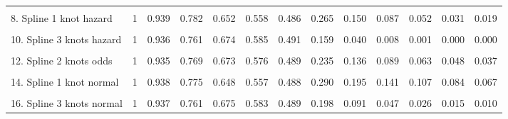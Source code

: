 \documentclass[]{article}
\begin{document}
{\begin{tabular}{lrrrrrrrrrrrr}
\cellcolor{gray!6}{7. Generalised Gamma} & \cellcolor{gray!6}{1} & \cellcolor{gray!6}{0.937} & \cellcolor{gray!6}{0.774} & \cellcolor{gray!6}{0.648} & \cellcolor{gray!6}{0.556} & \cellcolor{gray!6}{0.488} & \cellcolor{gray!6}{0.310} & \cellcolor{gray!6}{0.232} & \cellcolor{gray!6}{0.187} & \cellcolor{gray!6}{0.158} & \cellcolor{gray!6}{0.138} & \cellcolor{gray!6}{0.122}\\
8. Spline 1 knot hazard & 1 & 0.939 & 0.782 & 0.652 & 0.558 & 0.486 & 0.265 & 0.150 & 0.087 & 0.052 & 0.031 & 0.019\\
\cellcolor{gray!6}{9. Spline 2 knots hazard} & \cellcolor{gray!6}{1} & \cellcolor{gray!6}{0.935} & \cellcolor{gray!6}{0.766} & \cellcolor{gray!6}{0.673} & \cellcolor{gray!6}{0.579} & \cellcolor{gray!6}{0.490} & \cellcolor{gray!6}{0.184} & \cellcolor{gray!6}{0.061} & \cellcolor{gray!6}{0.018} & \cellcolor{gray!6}{0.005} & \cellcolor{gray!6}{0.001} & \cellcolor{gray!6}{0.000}\\
10. Spline 3 knots hazard & 1 & 0.936 & 0.761 & 0.674 & 0.585 & 0.491 & 0.159 & 0.040 & 0.008 & 0.001 & 0.000 & 0.000\\
\cellcolor{gray!6}{11. Spline 1 knot odds} & \cellcolor{gray!6}{1} & \cellcolor{gray!6}{0.939} & \cellcolor{gray!6}{0.778} & \cellcolor{gray!6}{0.648} & \cellcolor{gray!6}{0.556} & \cellcolor{gray!6}{0.489} & \cellcolor{gray!6}{0.301} & \cellcolor{gray!6}{0.213} & \cellcolor{gray!6}{0.162} & \cellcolor{gray!6}{0.131} & \cellcolor{gray!6}{0.109} & \cellcolor{gray!6}{0.093}\\
12. Spline 2 knots odds & 1 & 0.935 & 0.769 & 0.673 & 0.576 & 0.489 & 0.235 & 0.136 & 0.089 & 0.063 & 0.048 & 0.037\\
\cellcolor{gray!6}{13. Spline 3 knots odds} & \cellcolor{gray!6}{1} & \cellcolor{gray!6}{0.937} & \cellcolor{gray!6}{0.761} & \cellcolor{gray!6}{0.675} & \cellcolor{gray!6}{0.583} & \cellcolor{gray!6}{0.489} & \cellcolor{gray!6}{0.207} & \cellcolor{gray!6}{0.108} & \cellcolor{gray!6}{0.066} & \cellcolor{gray!6}{0.044} & \cellcolor{gray!6}{0.032} & \cellcolor{gray!6}{0.024}\\
14. Spline 1 knot normal & 1 & 0.938 & 0.775 & 0.648 & 0.557 & 0.488 & 0.290 & 0.195 & 0.141 & 0.107 & 0.084 & 0.067\\
\cellcolor{gray!6}{15. Spline 2 knots normal} & \cellcolor{gray!6}{1} & \cellcolor{gray!6}{0.930} & \cellcolor{gray!6}{0.773} & \cellcolor{gray!6}{0.669} & \cellcolor{gray!6}{0.572} & \cellcolor{gray!6}{0.489} & \cellcolor{gray!6}{0.240} & \cellcolor{gray!6}{0.135} & \cellcolor{gray!6}{0.083} & \cellcolor{gray!6}{0.054} & \cellcolor{gray!6}{0.037} & \cellcolor{gray!6}{0.026}\\
16. Spline 3 knots normal & 1 & 0.937 & 0.761 & 0.675 & 0.583 & 0.489 & 0.198 & 0.091 & 0.047 & 0.026 & 0.015 & 0.010\\
\bottomrule
\end{tabular}}
\end{document}
